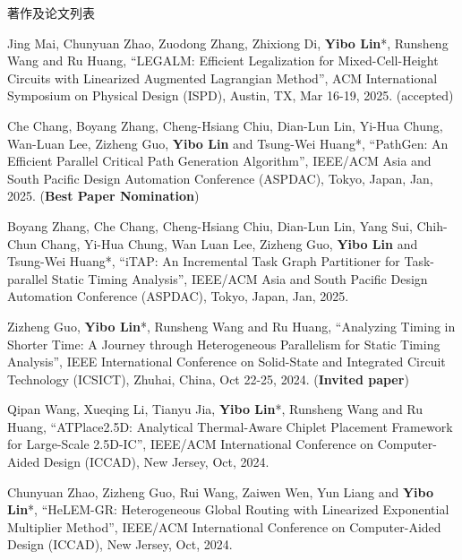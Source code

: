 \begin{rSection}{著作及论文列表}
\begin{description}[font=\normalfont, rightmargin=2em]
\item[{[C169]}]{
        Jing Mai, Chunyuan Zhao, Zuodong Zhang, Zhixiong Di, \textbf{Yibo Lin}*, Runsheng Wang and Ru Huang, 
    ``LEGALM: Efficient Legalization for Mixed-Cell-Height Circuits with Linearized Augmented Lagrangian Method'', 
    ACM International Symposium on Physical Design (ISPD), Austin, TX, Mar 16-19, 2025.
    (accepted)
}
            

\item[{[C168]}]{
        Che Chang, Boyang Zhang, Cheng-Hsiang Chiu, Dian-Lun Lin, Yi-Hua Chung, Wan-Luan Lee, Zizheng Guo, \textbf{Yibo Lin} and Tsung-Wei Huang*, 
    ``PathGen: An Efficient Parallel Critical Path Generation Algorithm'', 
    IEEE/ACM Asia and South Pacific Design Automation Conference (ASPDAC), Tokyo, Japan, Jan, 2025.
    (\textbf{Best Paper Nomination})
}
            

\item[{[C167]}]{
        Boyang Zhang, Che Chang, Cheng-Hsiang Chiu, Dian-Lun Lin, Yang Sui, Chih-Chun Chang, Yi-Hua Chung, Wan Luan Lee, Zizheng Guo, \textbf{Yibo Lin} and Tsung-Wei Huang*, 
    ``iTAP: An Incremental Task Graph Partitioner for Task-parallel Static Timing Analysis'', 
    IEEE/ACM Asia and South Pacific Design Automation Conference (ASPDAC), Tokyo, Japan, Jan, 2025.
    
}
            

\item[{[C166]}]{
        Zizheng Guo, \textbf{Yibo Lin}*, Runsheng Wang and Ru Huang, 
    ``Analyzing Timing in Shorter Time: A Journey through Heterogeneous Parallelism for Static Timing Analysis'', 
    IEEE International Conference on Solid-State and Integrated Circuit Technology (ICSICT), Zhuhai, China, Oct 22-25, 2024.
    (\textbf{Invited paper})
}
            

\item[{[C165]}]{
        Qipan Wang, Xueqing Li, Tianyu Jia, \textbf{Yibo Lin}*, Runsheng Wang and Ru Huang, 
    ``ATPlace2.5D: Analytical Thermal-Aware Chiplet Placement Framework for Large-Scale 2.5D-IC'', 
    IEEE/ACM International Conference on Computer-Aided Design (ICCAD), New Jersey, Oct, 2024.
    
}
            

\item[{[C164]}]{
        Chunyuan Zhao, Zizheng Guo, Rui Wang, Zaiwen Wen, Yun Liang and \textbf{Yibo Lin}*, 
    ``HeLEM-GR: Heterogeneous Global Routing with Linearized Exponential Multiplier Method'', 
    IEEE/ACM International Conference on Computer-Aided Design (ICCAD), New Jersey, Oct, 2024.
    
}
\end{description}
\end{rSection}
